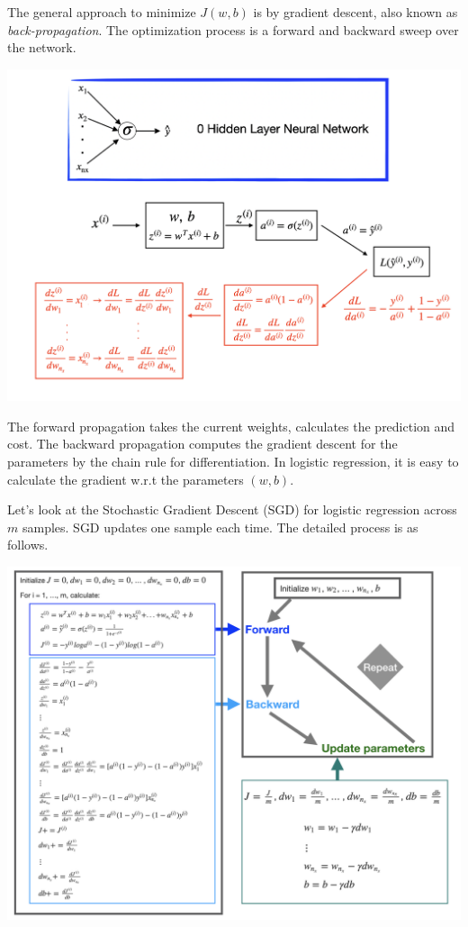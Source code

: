 \documentclass[12pt,]{krantz}
\begin{document}
The general approach to minimize \(J(w,b)\) is by gradient descent, also known as \emph{back-propagation}. The optimization process is a forward and backward sweep over the network.

\includegraphics[width=1\textwidth,height=\textheight]{images/dnn0_fb3.png}

The forward propagation takes the current weights, calculates the prediction and cost. The backward propagation computes the gradient descent for the parameters by the chain rule for differentiation. In logistic regression, it is easy to calculate the gradient w.r.t the parameters \((w, b)\).

Let's look at the Stochastic Gradient Descent (SGD) for logistic regression across \(m\) samples. SGD updates one sample each time. The detailed process is as follows.

\includegraphics[width=1\textwidth,height=\textheight]{images/GradientDescent.png}
\end{document}
